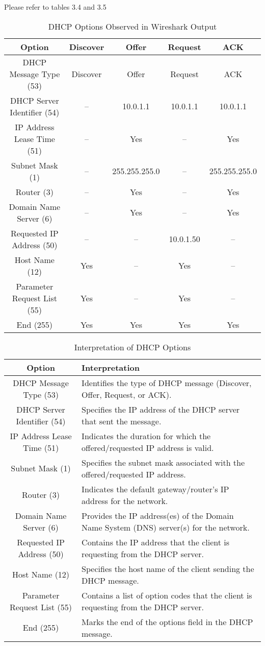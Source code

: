 Please refer to tables 3.4 and 3.5
\begin{table}[h]
\centering
\begin{tabular}{|c|c|c|c|c|}
\hline
\textbf{Option} & \textbf{Discover} & \textbf{Offer} & \textbf{Request} & \textbf{ACK} \\
\hline
DHCP Message Type (53) & Discover & Offer & Request & ACK \\
\hline
DHCP Server Identifier (54) & -- & 10.0.1.1 & 10.0.1.1 & 10.0.1.1 \\
\hline
IP Address Lease Time (51) & -- & Yes & -- & Yes \\
\hline
Subnet Mask (1) & -- & 255.255.255.0 & -- & 255.255.255.0 \\
\hline
Router (3) & -- & Yes & -- & Yes \\
\hline
Domain Name Server (6) & -- & Yes & -- & Yes \\
\hline
Requested IP Address (50) & -- & -- & 10.0.1.50 & -- \\
\hline
Host Name (12) & Yes & -- & Yes & -- \\
\hline
Parameter Request List (55) & Yes & -- & Yes & -- \\
\hline
End (255) & Yes & Yes & Yes & Yes \\
\hline
\end{tabular}
\caption{DHCP Options Observed in Wireshark Output}
\end{table}

\begin{table}[h]
\centering
\begin{tabular}{|c|p{10cm}|}
\hline
\textbf{Option} & \textbf{Interpretation} \\
\hline
DHCP Message Type (53) & Identifies the type of DHCP message (Discover, Offer, Request, or ACK). \\
\hline
DHCP Server Identifier (54) & Specifies the IP address of the DHCP server that sent the message. \\
\hline
IP Address Lease Time (51) & Indicates the duration for which the offered/requested IP address is valid. \\
\hline
Subnet Mask (1) & Specifies the subnet mask associated with the offered/requested IP address. \\
\hline
Router (3) & Indicates the default gateway/router's IP address for the network. \\
\hline
Domain Name Server (6) & Provides the IP address(es) of the Domain Name System (DNS) server(s) for the network. \\
\hline
Requested IP Address (50) & Contains the IP address that the client is requesting from the DHCP server. \\
\hline
Host Name (12) & Specifies the host name of the client sending the DHCP message. \\
\hline
Parameter Request List (55) & Contains a list of option codes that the client is requesting from the DHCP server. \\
\hline
End (255) & Marks the end of the options field in the DHCP message. \\
\hline
\end{tabular}
\caption{Interpretation of DHCP Options}
\end{table}
